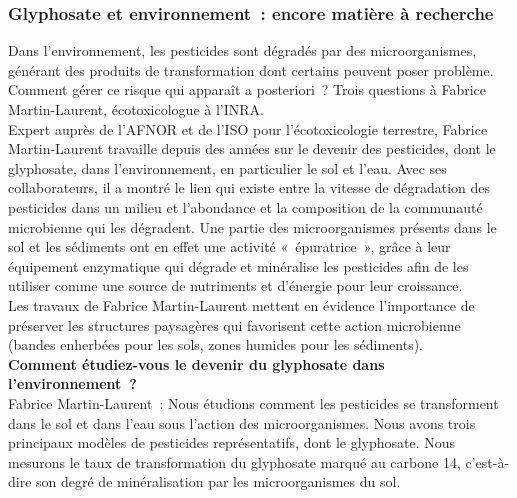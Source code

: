 \documentclass[8pt]{article}
\begin{document}
\subsubsection{Glyphosate et environnement~: encore matière à recherche}

Dans l’environnement, les pesticides sont dégradés par des microorganismes, générant des produits de transformation dont certains peuvent poser problème. Comment gérer ce risque qui apparaît a posteriori~? Trois questions à Fabrice Martin-Laurent, écotoxicologue à l’INRA.\\

Expert auprès de l’AFNOR et de l’ISO pour l’écotoxicologie terrestre, Fabrice Martin-Laurent travaille depuis des années sur le devenir des pesticides, dont le glyphosate, dans l’environnement, en particulier le sol et l’eau. Avec ses collaborateurs, il a montré le lien qui existe entre la vitesse de dégradation des pesticides dans un milieu et l’abondance et la composition de la communauté microbienne qui les dégradent. Une partie des microorganismes présents dans le sol et les sédiments ont en effet une activité «~épuratrice~», grâce à leur équipement enzymatique qui dégrade et minéralise les pesticides afin de les utiliser comme une source de nutriments et d’énergie pour leur croissance.\\

Les travaux de Fabrice Martin-Laurent mettent en évidence l’importance de préserver les structures paysagères qui favorisent cette action microbienne (bandes enherbées pour les sols, zones humides pour les sédiments).\\

\textbf{Comment étudiez-vous le devenir du glyphosate dans l’environnement~?}\\

Fabrice Martin-Laurent~: Nous étudions comment les pesticides se transforment dans le sol et dans l’eau sous l’action des microorganismes. Nous avons trois principaux modèles de pesticides représentatifs, dont le glyphosate. Nous mesurons le taux de transformation du glyphosate marqué au carbone 14, c’est-à-dire son degré de minéralisation par les microorganismes du sol.\\
\end{document}

